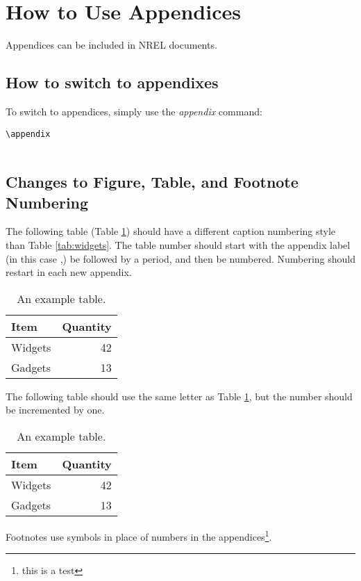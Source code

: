 \section{How to Use Appendices}
Appendices can be included in NREL documents. 

\subsection{How to switch to appendixes}
To switch to appendices, simply use the \emph{appendix} command:

\begin{lstlisting}
\appendix


\end{lstlisting}

\subsection{Changes to Figure, Table, and Footnote Numbering}
The following table (Table \ref{tab:AppAWidgets}) should have a different caption numbering style than Table \ref{tab:widgets}. The table number should start with the appendix label (in this case \thesection,) be followed by a period, and then be numbered. Numbering should restart in each new appendix.

\begin{table}[!h]
\centering
\caption{An example table.}\label{tab:AppAWidgets}
\begin{tabular}{lr}
Item & Quantity \\
\hline
Widgets & 42 \\
Gadgets & 13
\end{tabular}
\end{table}

The following table should use the same letter as Table \ref{tab:AppAWidgets}, but the number should be incremented by one.

\begin{table}[!h]
\centering
\caption{An example table.}\label{tab:AppAWidgetsTwo}
\begin{tabular}{lr}
Item & Quantity \\
\hline
Widgets & 42 \\
Gadgets & 13
\end{tabular}
\end{table}

Footnotes use symbols in place of numbers in the appendices\footnote{this is a test}.